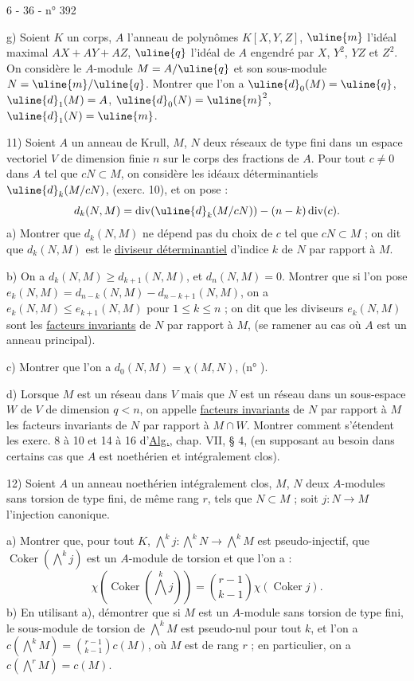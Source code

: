 \begin{center}6 - 36 - \hfill n° 392\end{center}
g) Soient $K$ un corps, $A$ l'anneau de polynômes $K[X,Y,Z]$, $\uline{m}$ l'idéal maximal $AX+AY+AZ$, $\uline{q}$ l'idéal de $A$ engendré par $X$, $Y^2$, $YZ$ et $Z^2$. On considère le $A$-module $M=A/\uline{q}$ et son sous-module $N=\uline{m}/\uline{q}$. Montrer que l'on a $\uline{d}_0(M)=\uline{q}$, $\uline{d}_1(M)=A$, $\uline{d}_0(N)=\uline{m}^2$, $\uline{d}_1(N)=\uline{m}$.

11) Soient $A$ un anneau de Krull, $M$, $N$ deux réseaux de type fini dans un espace vectoriel $V$ de dimension finie $n$ sur le corps des fractions de $A$. Pour tout $c\ne0$ dans $A$ tel que $cN\subset M$, on considère les idéaux déterminantiels $\uline{d}_k(M/cN)$, (exerc. 10), et on pose :
\[
d_k(N,M)=\operatorname{div}(\uline{d}_k(M/cN))-(n-k)\operatorname{div}(c).
\]
a) Montrer que $d_k(N,M)$ ne dépend pas du choix de $c$ tel que $cN\subset M$ ; on dit que $d_k(N,M)$ est le \uline{diviseur déterminantiel} d'indice $k$ de $N$ par rapport à $M$.

b) On a $d_k(N,M)\ge d_{k+1}(N,M)$, et $d_n(N,M)=0$. Montrer que si l'on pose $e_k(N,M)=d_{n-k}(N,M)-d_{n-k+1}(N,M)$, on a $e_k(N,M)\le e_{k+1}(N,M)$ pour $1\le k\le n$ ; on dit que les diviseurs $e_k(N,M)$ sont les \uline{facteurs invariants} de $N$ par rapport à $M$, (se ramener au cas où $A$ est un anneau principal).

c) Montrer que l'on a $d_0(N,M)=\chi(M,N)$, (n° \quad).

d) Lorsque $M$ est un réseau dans $V$ mais que $N$ est un réseau dans un sous-espace $W$ de $V$ de dimension $q<n$, on appelle \uline{facteurs invariants} de $N$ par rapport à $M$ les facteurs invariants de $N$ par rapport à $M\cap W$. Montrer comment s'étendent les exerc. 8 à 10 et 14 à 16 d'\uline{Alg.}, chap. VII, § 4, (en supposant au besoin dans certains cas que $A$ est noethérien et intégralement clos).

12) Soient $A$ un anneau noethérien intégralement clos, $M$, $N$ deux $A$-modules sans torsion de type fini, de même rang $r$, tels que $N\subset M$ ; soit $j:N\longrightarrow M$ l'injection canonique.

a) Montrer que, pour tout $K$, $\bigwedge^k j:\bigwedge^kN\longrightarrow\bigwedge^kM$ est pseudo-injectif, que $\operatorname{Coker}(\bigwedge^k j)$ est un $A$-module de torsion et que l'on a :
\[
\chi(\operatorname{Coker}(\bigwedge^k j))=\binom{r-1}{k-1}\chi(\operatorname{Coker}j).
\]
b) En utilisant a), démontrer que si $M$ est un $A$-module sans torsion de type fini, le sous-module de torsion de $\bigwedge^kM$ est pseudo-nul pour tout $k$, et l'on a $c(\bigwedge^kM)=\binom{r-1}{k-1}c(M)$, où $M$ est de rang $r$ ; en particulier, on a $c(\bigwedge^rM)=c(M)$.
